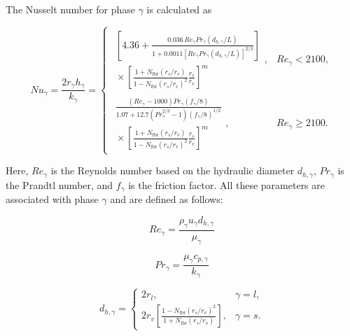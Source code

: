 \documentclass[14pt,letterpaper,fleqn]{extarticle}
\begin{document}
The Nusselt number for phase $\gamma$ is calculated as

\begin{equation}
Nu_{\gamma}
=
\frac{2r_{\gamma}h_{\gamma}}{k_{\gamma}}
=
\begin{cases}
\displaystyle
\begin{gathered}
\left[
4.36
+
\frac{
0.036\,Re_{\gamma}Pr_{\gamma}
\left(d_{h,\gamma}/L\right)
}{
1+
0.0011
\left[
Re_{\gamma}Pr_{\gamma}
\left(d_{h,\gamma}/L\right)
\right]^{2/3}
}
\right]
\\[3pt]
{}\times
\left[
\frac{
1+N_{\mathrm{fbr}}\left(r_s/r_v\right)
}{
1-N_{\mathrm{fbr}}\left(r_s/r_v\right)^2
}
\frac{r_s}{r_v}
\right]^m
\end{gathered},
&
Re_{\gamma}<2100,
\\[14pt]
\displaystyle
\begin{gathered}
\frac{
\left(Re_{\gamma}-1000\right)
Pr_{\gamma}
\left(f_{\gamma}/8\right)
}{
1.07+
12.7
\left(Pr_{\gamma}^{2/3}-1\right)
\left(f_{\gamma}/8\right)^{1/2}
}
\\[3pt]
{}\times
\left[
\frac{
1+N_{\mathrm{fbr}}\left(r_s/r_v\right)
}{
1-N_{\mathrm{fbr}}\left(r_s/r_v\right)^2
}
\frac{r_s}{r_v}
\right]^m
\end{gathered},
&
Re_{\gamma}\geq2100.
\end{cases}
\label{eq:nusselt-gamma}
\end{equation}

Here, $Re_{\gamma}$ is the Reynolds number based on the hydraulic diameter
$d_{h,\gamma}$, $Pr_{\gamma}$ is the Prandtl number, and $f_{\gamma}$ is the
friction factor. All these parameters are associated with phase $\gamma$ and
are defined as follows:

\begin{equation}
Re_{\gamma}
=
\frac{
\rho_{\gamma}u_{\gamma}d_{h,\gamma}
}{
\mu_{\gamma}
}
\label{eq:reynolds-gamma}
\end{equation}

\begin{equation}
Pr_{\gamma}
=
\frac{
\mu_{\gamma}c_{p,\gamma}
}{
k_{\gamma}
}
\label{eq:prandtl-gamma}
\end{equation}

\begin{equation}
d_{h,\gamma}
=
\begin{cases}
2r_l,
&
\gamma=l,
\\[6pt]
\displaystyle
2r_v
\left[
\frac{
1-N_{\mathrm{fbr}}\left(r_s/r_v\right)^2
}{
1+N_{\mathrm{fbr}}\left(r_s/r_v\right)
}
\right],
&
\gamma=s.
\end{cases}
\label{eq:hydraulic-diameter-gamma}
\end{equation}
\end{document}
